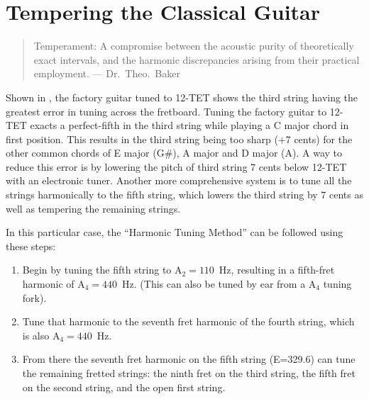%
%
%

 \section{Tempering the Classical Guitar\label{app:temp}}
 
 \begin{quote}
 Temperament: A compromise between the acoustic purity of theoretically exact intervals, and the harmonic discrepancies arising from their practical employment. --- Dr.\ Theo.\ Baker~\cite{ref:baker1895dmt}
 \end{quote}

Shown in , the factory guitar tuned to 12-TET shows the third string having the greatest error in tuning across the fretboard. Tuning the factory guitar to 12-TET exacts a perfect-fifth in the third string while playing a C major chord in first position. This results in the third string being too sharp (+7 cents) for the other common chords of E major (G\#), A major and D major (A). A way to reduce this error is by lowering the pitch of third string 7 cents below 12-TET with an electronic tuner. Another more comprehensive system is to tune all the strings harmonically to the fifth string, which lowers the third string by 7 cents as well as tempering the remaining strings.

In this particular case, the ``Harmonic Tuning Method'' can be followed using these steps:
 \begin{enumerate}
  \item Begin by tuning the fifth string to A$_2 = 110$~Hz, resulting in a fifth-fret harmonic of A$_4 = 440$~Hz. (This can also be tuned by ear from a A$_4$ tuning fork).
  \item Tune that harmonic to the seventh fret harmonic of the fourth string, which is also A$_4 = 440$~Hz.
  \item From there the seventh fret harmonic on the fifth string (E=329.6) can tune the remaining fretted strings: the ninth fret on the third string, the fifth fret on the second string, and the open first string. 
  \end{enumerate}

